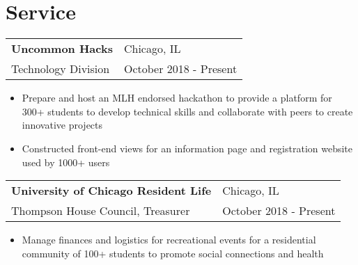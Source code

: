 \documentclass[letterpaper, 12pt]{article}
\begin{document}
\section{Service}
\vspace{10pt}
\begin{tabular}{@{} L{12cm} @{} R{4.51cm} @{}}
  \textbf{Uncommon Hacks} & Chicago, IL \\
  Technology Division & October 2018 - Present \\
\end{tabular}
\vspace{-10pt}
\begin{itemize}
  \item Prepare and host an MLH endorsed hackathon to provide a platform for 300+ students to develop technical skills and collaborate with peers to create innovative projects
  \item Constructed front-end views for an information page and registration website used by 1000+ users
\end{itemize}

\begin{tabular}{@{} L{12cm} @{} R{4.51cm} @{}}
  \textbf{University of Chicago Resident Life} & Chicago, IL \\
  Thompson House Council, Treasurer & October 2018 - Present \\
\end{tabular}
\vspace{-10pt}
\begin{itemize}
  \item Manage finances and logistics for recreational events for a residential community of 100+ students to promote social connections and health
\end{itemize}
\end{document}
